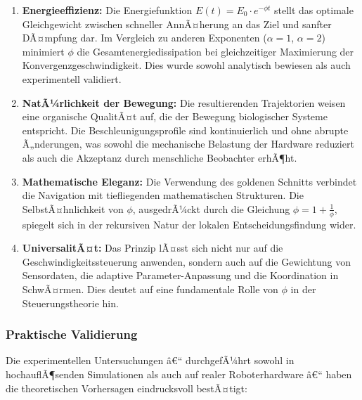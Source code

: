 ﻿\documentclass[a4paper,12pt]{article}
\theoremstyle{definition}
\begin{document}
\begin{enumerate}
	\item \textbf{Energieeffizienz:} Die Energiefunktion $E(t) = E_0 \cdot e^{-\phi t}$ stellt das optimale Gleichgewicht zwischen schneller AnnÃ¤herung an das Ziel und sanfter DÃ¤mpfung dar. Im Vergleich zu anderen Exponenten ($\alpha = 1$, $\alpha = 2$) minimiert $\phi$ die Gesamtenergiedissipation bei gleichzeitiger Maximierung der Konvergenzgeschwindigkeit. Dies wurde sowohl analytisch bewiesen als auch experimentell validiert.
	
	\item \textbf{NatÃ¼rlichkeit der Bewegung:} Die resultierenden Trajektorien weisen eine organische QualitÃ¤t auf, die der Bewegung biologischer Systeme entspricht. Die Beschleunigungsprofile sind kontinuierlich und ohne abrupte Ã„nderungen, was sowohl die mechanische Belastung der Hardware reduziert als auch die Akzeptanz durch menschliche Beobachter erhÃ¶ht.
	
	\item \textbf{Mathematische Eleganz:} Die Verwendung des goldenen Schnitts verbindet die Navigation mit tiefliegenden mathematischen Strukturen. Die SelbstÃ¤hnlichkeit von $\phi$, ausgedrÃ¼ckt durch die Gleichung $\phi = 1 + \frac{1}{\phi}$, spiegelt sich in der rekursiven Natur der lokalen Entscheidungsfindung wider.
	
	\item \textbf{UniversalitÃ¤t:} Das Prinzip lÃ¤sst sich nicht nur auf die Geschwindigkeitssteuerung anwenden, sondern auch auf die Gewichtung von Sensordaten, die adaptive Parameter-Anpassung und die Koordination in SchwÃ¤rmen. Dies deutet auf eine fundamentale Rolle von $\phi$ in der Steuerungstheorie hin.
\end{enumerate}

\subsubsection{Praktische Validierung}

Die experimentellen Untersuchungen â€“ durchgefÃ¼hrt sowohl in hochauflÃ¶senden Simulationen als auch auf realer Roboterhardware â€“ haben die theoretischen Vorhersagen eindrucksvoll bestÃ¤tigt:
\end{document}
